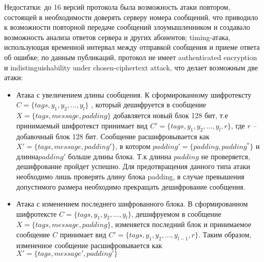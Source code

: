 Недостатки: до 16 версий протокола была  возможность атаки повтором, состоящей в необходимости доверять серверу номера сообщений, что приводило к возможности повторной передаче сообщений злоумышленником и создавало возможность анализа ответов сервера и других абонентов; timing-атака, использующая  временной интервал между отправкой сообщения и приеме ответа об ошибке; по данным публикаций, протокол не имеет authenticated encryption и indistinguishability under chosen-ciphertext attack, что делает возможным две атаки:
\begin{itemize}
	\item Атака с увеличением длины сообщения. К сформированному шифротексту $ C=\{tags, y_{1}, y_{2}, ... , y_{l}\} $ , который дешифруется в сообщение $ X= \{tags,message,padding\} $ добавляется новый блок 128 бит, т.е принимаемый шифротекст принимает вид $ C'=\{tags, y_{1}, y_{2}, ... , y_{l}, r\} $, где $ r $ -- добавочный блок 128 бит. Сообщение расшифровывается как $ X'= \{tags,message,padding'\} $, в котором $  padding' =  \{padding, padding^{*}\}$ и длинна$  padding' $ больше длины блока. Т.к длинна $ padding $ не проверяется, дешифрование пройдет успешно. Для предотвращения данного типа атаки необходимо лишь проверять длину блока padding, в случае превышения допустимого размера необходимо прекращать дешифрование сообщения.
	\item Атака с изменением последнего шифрованного блока. В сформированном шифротексте $ C=\{tags, y_{1}, y_{2}, ... , y_{l}\} $, дешифруемом в сообщение $ X=  \{tags,message,padding\} $, изменяется последний блок и принимаемое сообщение  $ C $ принимает вид $ C'=\{tags, y_{1}, y_{2}, ... , y_{l-1}, r\} $. Таким образом, измененное сообщение расшифровывается как    $ X'= \{tags,message',padding'\} $
\end{itemize}
\newpage